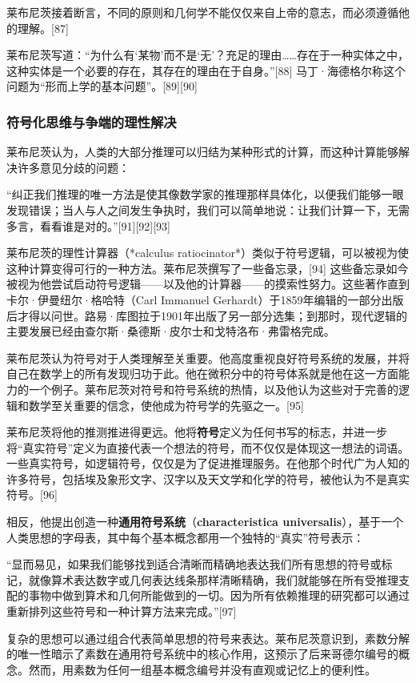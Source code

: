 莱布尼茨接着断言，不同的原则和几何学不能仅仅来自上帝的意志，而必须遵循他的理解。[87]

莱布尼茨写道：“为什么有‘某物’而不是‘无’？充足的理由……存在于一种实体之中，这种实体是一个必要的存在，其存在的理由在于自身。”[88] 马丁·海德格尔称这个问题为“形而上学的基本问题”。[89][90]
\subsubsection{符号化思维与争端的理性解决}

莱布尼茨认为，人类的大部分推理可以归结为某种形式的计算，而这种计算能够解决许多意见分歧的问题：

“纠正我们推理的唯一方法是使其像数学家的推理那样具体化，以便我们能够一眼发现错误；当人与人之间发生争执时，我们可以简单地说：让我们计算一下，无需多言，看看谁是对的。”[91][92][93] 

莱布尼茨的理性计算器（*calculus ratiocinator*）类似于符号逻辑，可以被视为使这种计算变得可行的一种方法。莱布尼茨撰写了一些备忘录，[94] 这些备忘录如今被视为他尝试启动符号逻辑——以及他的计算器——的摸索性努力。这些著作直到卡尔·伊曼纽尔·格哈特（Carl Immanuel Gerhardt）于1859年编辑的一部分出版后才得以问世。路易·库图拉于1901年出版了另一部分选集；到那时，现代逻辑的主要发展已经由查尔斯·桑德斯·皮尔士和戈特洛布·弗雷格完成。

莱布尼茨认为符号对于人类理解至关重要。他高度重视良好符号系统的发展，并将自己在数学上的所有发现归功于此。他在微积分中的符号体系就是他在这一方面能力的一个例子。莱布尼茨对符号和符号系统的热情，以及他认为这些对于完善的逻辑和数学至关重要的信念，使他成为符号学的先驱之一。[95]

莱布尼茨将他的推测推进得更远。他将\textbf{符号}定义为任何书写的标志，并进一步将“真实符号”定义为直接代表一个想法的符号，而不仅仅是体现这一想法的词语。一些真实符号，如逻辑符号，仅仅是为了促进推理服务。在他那个时代广为人知的许多符号，包括埃及象形文字、汉字以及天文学和化学的符号，被他认为不是真实符号。[96]  

相反，他提出创造一种\textbf{通用符号系统}（\textbf{characteristica universalis}），基于一个人类思想的字母表，其中每个基本概念都用一个独特的“真实”符号表示：

“显而易见，如果我们能够找到适合清晰而精确地表达我们所有思想的符号或标记，就像算术表达数字或几何表达线条那样清晰精确，我们就能够在所有受推理支配的事物中做到算术和几何所能做到的一切。因为所有依赖推理的研究都可以通过重新排列这些符号和一种计算方法来完成。”[97]
 
复杂的思想可以通过组合代表简单思想的符号来表达。莱布尼茨意识到，素数分解的唯一性暗示了素数在通用符号系统中的核心作用，这预示了后来哥德尔编号的概念。然而，用素数为任何一组基本概念编号并没有直观或记忆上的便利性。

